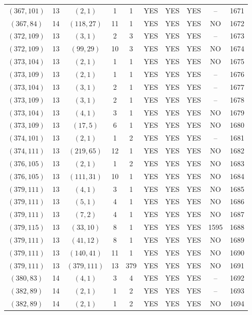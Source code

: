 \begin{longtable}{|c|c|c|c|c|c|c|c|c|c|}
$(367, 101)$ & 13 & $(2, 1)$ & 1 & 1 & YES & YES & YES & -- & 1671\\
$(367, 84)$ & 14 & $(118, 27)$ & 11 & 1 & YES & YES & YES & NO & 1672\\
$(372, 109)$ & 13 & $(3, 1)$ & 2 & 3 & YES & YES & YES & -- & 1673\\
$(372, 109)$ & 13 & $(99, 29)$ & 10 & 3 & YES & YES & YES & NO & 1674\\
$(373, 104)$ & 13 & $(2, 1)$ & 1 & 1 & YES & YES & YES & NO & 1675\\
$(373, 109)$ & 13 & $(2, 1)$ & 1 & 1 & YES & YES & YES & -- & 1676\\
$(373, 104)$ & 13 & $(3, 1)$ & 2 & 1 & YES & YES & YES & -- & 1677\\
$(373, 109)$ & 13 & $(3, 1)$ & 2 & 1 & YES & YES & YES & -- & 1678\\
$(373, 104)$ & 13 & $(4, 1)$ & 3 & 1 & YES & YES & YES & NO & 1679\\
$(373, 109)$ & 13 & $(17, 5)$ & 6 & 1 & YES & YES & YES & NO & 1680\\
$(374, 101)$ & 13 & $(2, 1)$ & 1 & 2 & YES & YES & YES & -- & 1681\\
$(374, 111)$ & 13 & $(219, 65)$ & 12 & 1 & YES & YES & YES & NO & 1682\\
$(376, 105)$ & 13 & $(2, 1)$ & 1 & 2 & YES & YES & YES & NO & 1683\\
$(376, 105)$ & 13 & $(111, 31)$ & 10 & 1 & YES & YES & YES & NO & 1684\\
$(379, 111)$ & 13 & $(4, 1)$ & 3 & 1 & YES & YES & YES & NO & 1685\\
$(379, 111)$ & 13 & $(5, 1)$ & 4 & 1 & YES & YES & YES & NO & 1686\\
$(379, 111)$ & 13 & $(7, 2)$ & 4 & 1 & YES & YES & YES & NO & 1687\\
$(379, 115)$ & 13 & $(33, 10)$ & 8 & 1 & YES & YES & YES & 1595 & 1688\\
$(379, 111)$ & 13 & $(41, 12)$ & 8 & 1 & YES & YES & YES & NO & 1689\\
$(379, 111)$ & 13 & $(140, 41)$ & 11 & 1 & YES & YES & YES & NO & 1690\\
$(379, 111)$ & 13 & $(379, 111)$ & 13 & 379 & YES & YES & YES & NO & 1691\\
$(380, 83)$ & 14 & $(4, 1)$ & 3 & 4 & YES & YES & YES & -- & 1692\\
$(382, 89)$ & 14 & $(2, 1)$ & 1 & 2 & YES & YES & YES & -- & 1693\\
$(382, 89)$ & 14 & $(2, 1)$ & 1 & 2 & YES & YES & YES & NO & 1694\\

\end{longtable}
